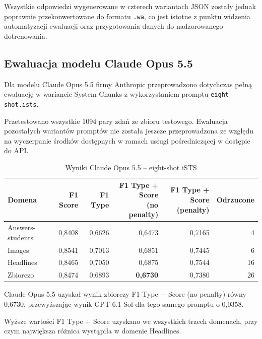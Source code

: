 \documentclass[a4paper,10pt]{article}
\begin{document}
Wszystkie odpowiedzi wygenerowane w czterech wariantach
JSON zostały jednak poprawnie przekonwertowane do
formatu \texttt{.wa}, co jest istotne z punktu widzenia
automatyzacji ewaluacji oraz przygotowania danych
do nadzorowanego dotrenowania.


\subsection{Ewaluacja modelu Claude Opus 5.5}

Dla modelu Claude Opus 5.5 firmy Anthropic
przeprowadzono dotychczas pełną ewaluację w wariancie
System Chunks z wykorzystaniem promptu
\texttt{eight-shot.ists}.

Przetestowano wszystkie 1094 pary zdań ze zbioru
testowego. Ewaluacja pozostałych wariantów promptów
nie została jeszcze przeprowadzona ze względu na
wyczerpanie środków dostępnych w ramach usługi
pośredniczącej w dostępie do API.

\begin{table}[htbp]
    \centering
    \small
    \caption{Wyniki Claude Opus 5.5 -- eight-shot iSTS}
    \label{tab:opus_results}
    \begin{tabular}{lrrrrr}
        \toprule
        Domena
        & F1 Score
        & F1 Type
        & \shortstack{F1 Type + Score\\(no penalty)}
        & \shortstack{F1 Type + Score\\(penalty)}
        & Odrzucone \\
        \midrule
        Answers-students
            & 0,8408 & 0,6626 & 0,6473 & 0,7165 & 4 \\
        Images
            & 0,8541 & 0,7013 & 0,6851 & 0,7445 & 6 \\
        Headlines
            & 0,8465 & 0,7050 & 0,6875 & 0,7544 & 16 \\
        \midrule
        Zbiorczo
            & 0,8474 & 0,6893
            & \textbf{0,6730} & 0,7380 & 26 \\
        \bottomrule
    \end{tabular}
\end{table}

Claude Opus 5.5 uzyskał wynik zbiorczy F1 Type + Score
(no penalty) równy 0,6730, przewyższając wynik
GPT-6.1 Sol dla tego samego promptu o 0,0358.

Wyższe wartości F1 Type + Score uzyskano we wszystkich
trzech domenach, przy czym największa różnica wystąpiła
w domenie Headlines.
\end{document}
